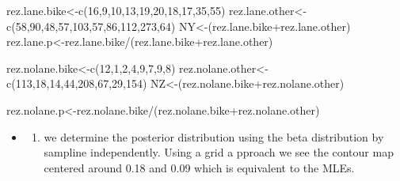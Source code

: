 \documentclass[
]{book}
\newenvironment{Shaded}{\begin{snugshade}}{\end{snugshade}}
\newcommand{\DecValTok}[1]{\textcolor[rgb]{0.00,0.00,0.81}{#1}}
\newcommand{\FunctionTok}[1]{\textcolor[rgb]{0.00,0.00,0.00}{#1}}
\newcommand{\NormalTok}[1]{#1}
\newcommand{\OtherTok}[1]{\textcolor[rgb]{0.56,0.35,0.01}{#1}}
\newcommand{\SpecialCharTok}[1]{\textcolor[rgb]{0.00,0.00,0.00}{#1}}
\providecommand{\tightlist}{%
  \setlength{\itemsep}{0pt}\setlength{\parskip}{0pt}}
\theoremstyle{definition}
\theoremstyle{definition}
\theoremstyle{definition}
\theoremstyle{definition}
\theoremstyle{remark}
\begin{document}
\begin{Shaded}
\begin{Highlighting}[]
\NormalTok{rez.lane.bike}\OtherTok{\textless{}{-}}\FunctionTok{c}\NormalTok{(}\DecValTok{16}\NormalTok{,}\DecValTok{9}\NormalTok{,}\DecValTok{10}\NormalTok{,}\DecValTok{13}\NormalTok{,}\DecValTok{19}\NormalTok{,}\DecValTok{20}\NormalTok{,}\DecValTok{18}\NormalTok{,}\DecValTok{17}\NormalTok{,}\DecValTok{35}\NormalTok{,}\DecValTok{55}\NormalTok{)}
\NormalTok{rez.lane.other}\OtherTok{\textless{}{-}}\FunctionTok{c}\NormalTok{(}\DecValTok{58}\NormalTok{,}\DecValTok{90}\NormalTok{,}\DecValTok{48}\NormalTok{,}\DecValTok{57}\NormalTok{,}\DecValTok{103}\NormalTok{,}\DecValTok{57}\NormalTok{,}\DecValTok{86}\NormalTok{,}\DecValTok{112}\NormalTok{,}\DecValTok{273}\NormalTok{,}\DecValTok{64}\NormalTok{)}
\NormalTok{NY}\OtherTok{\textless{}{-}}\NormalTok{(rez.lane.bike}\SpecialCharTok{+}\NormalTok{rez.lane.other)}
\NormalTok{rez.lane.p}\OtherTok{\textless{}{-}}\NormalTok{rez.lane.bike}\SpecialCharTok{/}\NormalTok{(rez.lane.bike}\SpecialCharTok{+}\NormalTok{rez.lane.other)}

\NormalTok{rez.nolane.bike}\OtherTok{\textless{}{-}}\FunctionTok{c}\NormalTok{(}\DecValTok{12}\NormalTok{,}\DecValTok{1}\NormalTok{,}\DecValTok{2}\NormalTok{,}\DecValTok{4}\NormalTok{,}\DecValTok{9}\NormalTok{,}\DecValTok{7}\NormalTok{,}\DecValTok{9}\NormalTok{,}\DecValTok{8}\NormalTok{)}
\NormalTok{rez.nolane.other}\OtherTok{\textless{}{-}}\FunctionTok{c}\NormalTok{(}\DecValTok{113}\NormalTok{,}\DecValTok{18}\NormalTok{,}\DecValTok{14}\NormalTok{,}\DecValTok{44}\NormalTok{,}\DecValTok{208}\NormalTok{,}\DecValTok{67}\NormalTok{,}\DecValTok{29}\NormalTok{,}\DecValTok{154}\NormalTok{)}
\NormalTok{NZ}\OtherTok{\textless{}{-}}\NormalTok{(rez.nolane.bike}\SpecialCharTok{+}\NormalTok{rez.nolane.other)}

\NormalTok{rez.nolane.p}\OtherTok{\textless{}{-}}\NormalTok{rez.nolane.bike}\SpecialCharTok{/}\NormalTok{(rez.nolane.bike}\SpecialCharTok{+}\NormalTok{rez.nolane.other)}
\end{Highlighting}
\end{Shaded}

\begin{itemize}
\item
  \begin{enumerate}
  \def\labelenumi{(\alph{enumi})}
  \setcounter{enumi}{2}
  \tightlist
  \item
    we determine the posterior distribution using the beta distribution by sampline independently. Using a grid a pproach we see the contour map centered around 0.18 and 0.09 which is equivalent to the MLEs.
  \end{enumerate}
\end{itemize}
\end{document}

